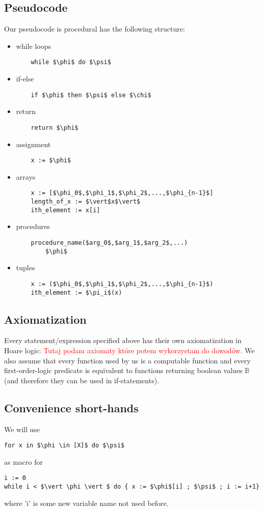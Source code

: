 \documentclass[12pt]{article}
\begin{document}
\subsection{Pseudocode}
Our pseudocode is procedural has the following structure:
\begin{itemize}
	\item while loops
	\begin{lstlisting}
	while $\phi$ do $\psi$ 
	\end{lstlisting}
	\item if-else 
	\begin{lstlisting}
	if $\phi$ then $\psi$ else $\chi$ 
	\end{lstlisting}
	\item return
	\begin{lstlisting}
	return $\phi$
	\end{lstlisting}
	\item assignment
    \begin{lstlisting}
	x := $\phi$
	\end{lstlisting}
	\item arrays
	\begin{lstlisting}
	x := [$\phi_0$,$\phi_1$,$\phi_2$,...,$\phi_{n-1}$]
	length_of_x := $\vert$x$\vert$ 
	ith_element := x[i]
	\end{lstlisting}
	\item procedures
	\begin{lstlisting}
	procedure_name($arg_0$,$arg_1$,$arg_2$,...)
		$\phi$
	\end{lstlisting}
	\item tuples
	\begin{lstlisting}
	x := ($\phi_0$,$\phi_1$,$\phi_2$,...,$\phi_{n-1}$)
	ith_element := $\pi_i$(x)
	\end{lstlisting}
\end{itemize}

\subsection{Axiomatization}
Every statement/expression specified above has their own axiomatization in Hoare logic:
 \textcolor{red}{Tutaj podam axiomaty które potem wykorzystam do dowodów.}
 We also assume that every function used by us is a computable function and every first-order-logic predicate is equivalent to functions returning boolean values $\mathbb{ B}$ (and therefore they can be used in if-statements).
\subsection{Convenience short-hands}
We will use
\begin{lstlisting}
for x in $\phi \in [X]$ do $\psi$ 
\end{lstlisting}
as macro for 
\begin{lstlisting}
i := 0
while i < $\vert \phi \vert $ do { x := $\phi$[i] ; $\psi$ ; i := i+1}
\end{lstlisting}
where 'i' is some new variable name not used before.
\end{document}
